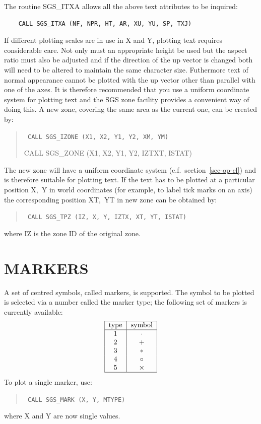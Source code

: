 \documentclass[11pt]{article}
\newcommand{\hyperref}[4]{#2\ref{#4}#3}
\newcommand{\htmlref}[2]{#1}
\begin{document}
The routine
\htmlref{SGS\_ITXA}{SGS_ITXA}
allows all the above text attributes to be inquired:
\begin{verbatim}
    CALL SGS_ITXA (NF, NPR, HT, AR, XU, YU, SP, TXJ)
\end{verbatim}
If different plotting scales are in use in X and Y, plotting text requires
considerable care.  Not only must an appropriate height be used but the aspect
ratio must also be adjusted and if the direction of the up vector is changed
both will need to be altered to maintain the same character size.  Futhermore
text of normal appearance cannot be plotted with the up vector other than
parallel with one of the axes.
It is therefore recommended that you use a uniform coordinate system for
plotting text and the SGS zone facility provides a convenient way of doing
this.  A new zone, covering the same area as the current
one, can be created by:
\begin{quote}{\tt
    CALL \htmlref{SGS\_IZONE}{SGS_IZONE} (X1, X2, Y1, Y2, XM, YM)

    CALL \htmlref{SGS\_ZONE}{SGS_ZONE} (X1, X2, Y1, Y2, IZTXT, ISTAT)}
\end{quote}
The new zone will have a uniform coordinate system (c.f.\
\hyperref{this section}{section~}{}{sec-op-cl}) and is
therefore suitable for plotting text.  If the text has to be plotted at a
particular position X,~Y in world coordinates (for example, to label tick
marks on an axis) the corresponding position XT,~YT in new zone can be obtained
by:
\begin{quote}{\tt
    CALL \htmlref{SGS\_TPZ}{SGS_TPZ} (IZ, X, Y, IZTX, XT, YT, ISTAT)}
\end{quote}
where IZ is the zone ID of the original zone.

\section {MARKERS}\label{sec-markers}

A set of centred symbols, called markers, is supported.  The
symbol to be plotted is selected via a number called the marker
type;  the following set of markers is currently available:
\[\tt\begin{tabular}{|c|c|}\hline
type&symbol\\\hline
1&$\cdot$\\
2&$+$\\
3&$\ast$\\
4&$\circ$\\
5&$\times$\\\hline
\end{tabular}\]
To plot a single marker,
use:
\begin{quote}{\tt
    CALL \htmlref{SGS\_MARK}{SGS_MARK} (X, Y, MTYPE)}
\end{quote}
where X and Y are now single values.
\end{document}
